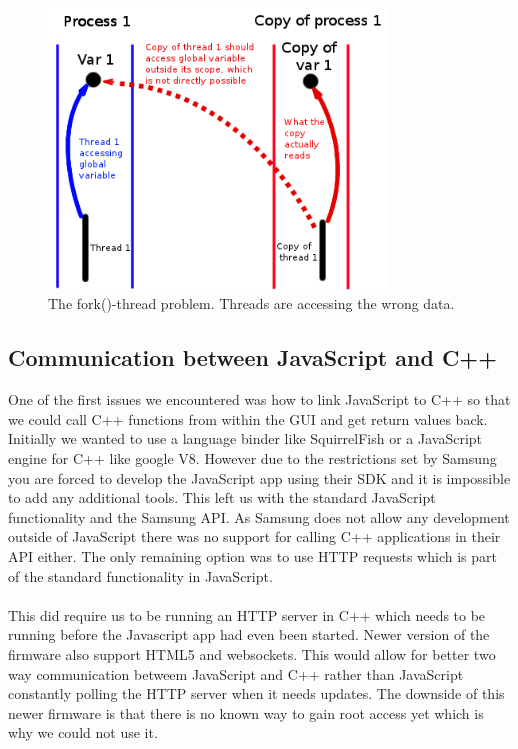 \begin{center}
\begin{figure}[h]
	\centering
	\mbox{\includegraphics[width=0.8\textwidth]{Images/fork-thread.png}}
	\caption{The fork()-thread problem. Threads are accessing the wrong data.}
	\label{fig:fork_thread}
\end{figure}
\end{center}

\subsection{Communication between JavaScript and C++}
One of the first issues we encountered was how to link JavaScript to C++ so that we could call C++ functions from within the GUI and get return values back. Initially we wanted to use a language binder like SquirrelFish or a JavaScript engine for C++ like google V8. However due to the restrictions set by Samsung you are forced to develop the JavaScript app using their SDK and it is impossible to add any additional tools. This left us with the standard JavaScript functionality and the Samsung API. As Samsung does not allow any development outside of JavaScript there was no support for calling C++ applications in their API either. The only remaining option was to use HTTP requests which is part of the standard functionality in JavaScript.
\\\\
This did require us to be running an HTTP server in C++ which needs to be running before the Javascript app had even been started. Newer version of the firmware also support HTML5 and websockets. This would allow for better two way communication betweem JavaScript and C++ rather than JavaScript constantly polling the HTTP server when it needs updates. The downside of this newer firmware is that there is no known way to gain root access yet which is why we could not use it.

